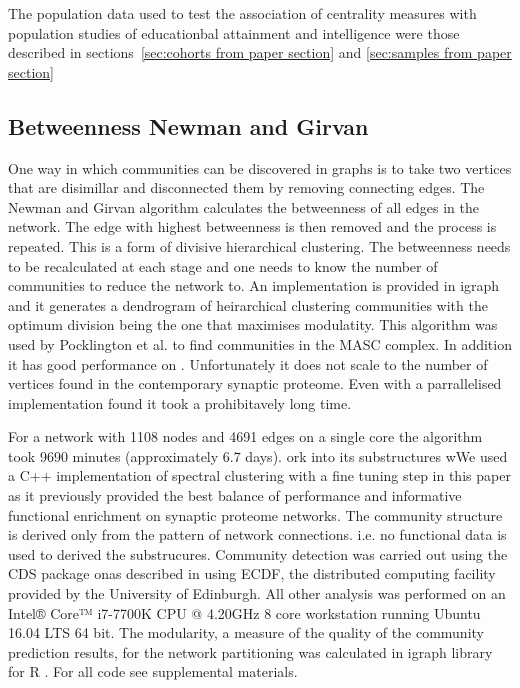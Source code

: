 The population data used to test the association of centrality measures with population studies of educationbal attainment and intelligence were those described in sections~\ref{sec:cohorts from paper section} and \ref{sec:samples from paper section}




\subsection{Betweenness Newman and Girvan}
One way in which communities can be discovered in graphs is to take two vertices that are
disimillar and disconnected them by removing connecting edges.
The Newman and Girvan algorithm \cite{newman2004finding}  calculates the betweenness
of all edges in the network. The edge with highest betweenness is then removed and the
process is repeated. This is a form of divisive hierarchical clustering. The betweenness
needs to be recalculated at each stage and one needs to know the number of communities
to reduce the network to. An implementation is provided in igraph and it generates a dendrogram of heirarchical clustering communities with the optimum division being the one that maximises modulatity. This algorithm was used by Pocklington et al. \cite{pocklington2006proteomes} to find
communities in the MASC complex. In addition it has good performance on . Unfortunately it does not scale to the number of
vertices found in the contemporary synaptic proteome. Even with a parrallelised implementation found it took a prohibitavely long time. 

For a network with 1108 nodes and 4691 edges on a single core the algorithm took 9690 minutes (approximately 6.7 days). \cite{mclean2016improved}
ork into its substructures wWe used a C++ implementation of spectral clustering with a fine tuning step in this paper as it previously provided the best balance of performance and informative functional enrichment on synaptic proteome networks. \cite{mclean2016improved}  The community structure is derived only from the pattern of network connections. i.e. no functional data is used to derived the substrucures.
Community detection was carried out using the CDS package onas described in \cite{mclean2016improved} using ECDF, the distributed computing facility provided by the University of Edinburgh. All other analysis was performed on an Intel® Core™ i7-7700K CPU @ 4.20GHz 8 core workstation running Ubuntu 16.04 LTS 64 bit.  
The modularity, a measure of the quality of the community prediction results, for the network partitioning was calculated in igraph library for R \cite{csardi2006igraph} . For all code see supplemental materials. 

